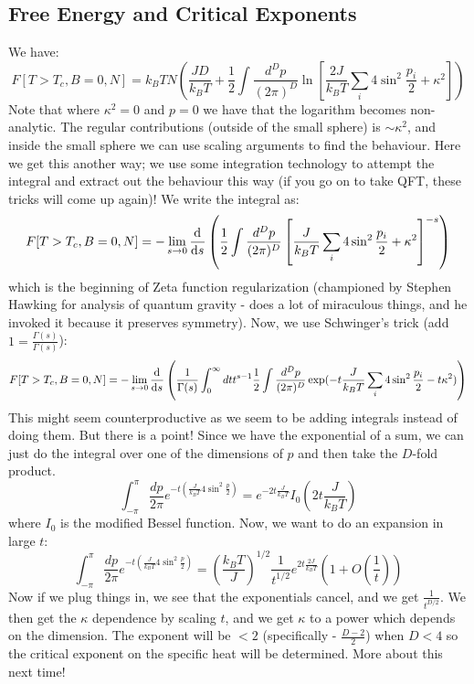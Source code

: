 \subsection{Free Energy and Critical Exponents}
We have:
\begin{equation}
    F[T > T_c, B = 0, N] = k_B TN\left(\frac{JD}{k_B T} + \frac{1}{2}\int \frac{d^Dp}{(2\pi)^D}\ln\left[\frac{2J}{k_B T} \sum_i 4\sin^2 \frac{p_i}{2} + \kappa^2\right] \right)
\end{equation}
Note that where $\kappa^2 = 0$ and $p = 0$ we have that the logarithm becomes non-analytic. The regular contributions (outside of the small sphere) is $\sim \kappa^2$, and inside the small sphere we can use scaling arguments to find the behaviour. Here we get this another way; we use some integration technology to attempt the integral and extract out the behaviour this way (if you go on to take QFT, these tricks will come up again)! We write the integral as:
\begin{equation}
    F[T > T_c, B = 0, N] = -\lim_{s \to 0}\dod{}{s}\left(\frac{1}{2}\int \frac{d^D p}{(2\pi)^D} \left[\frac{J}{k_B T}\sum_i 4\sin^2 \frac{p_i}{2} + \kappa^2\right]^{-s}\right)
\end{equation}
which is the beginning of Zeta function regularization (championed by Stephen Hawking for analysis of quantum gravity - does a lot of miraculous things, and he invoked it because it preserves symmetry). Now, we use Schwinger's trick (add $1 = \frac{\Gamma(s)}{\Gamma(s)}$):
\begin{equation}
    F[T > T_c, B = 0, N] = -\lim_{s \to 0}\dod{}{s}\left(\frac{1}{\Gamma(s)}\int_0^\infty dt t^{s-1}\frac{1}{2}\int \frac{d^Dp}{(2\pi)^D} \exp(-t\frac{J}{k_B T}\sum_i 4\sin^2\frac{p_i}{2} - t\kappa^2)\right)
\end{equation}
This might seem counterproductive as we seem to be adding integrals instead of doing them. But there is a point! Since we have the exponential of a sum, we can just do the integral over one of the dimensions of $p$ and then take the $D$-fold product.
\begin{equation}
    \int_{-\pi}^\pi \frac{dp}{2\pi} e^{-t\left(\frac{J}{k_B T}4\sin^2 \frac{p}{2}\right)} = e^{-2t\frac{J}{k_B T}}I_0(2t\frac{J}{k_B T})
\end{equation}
where $I_0$ is the modified Bessel function. Now, we want to do an expansion in large $t$:
\begin{equation}
    \int_{-\pi}^\pi \frac{dp}{2\pi} e^{-t\left(\frac{J}{k_B T}4\sin^2 \frac{p}{2}\right)} = \left(\frac{k_B T}{J}\right)^{1/2}\frac{1}{t^{1/2}}e^{2t\frac{2J}{k_B T}}\left(1 + O(\frac{1}{t})\right)
\end{equation}
Now if we plug things in, we see that the exponentials cancel, and we get $\frac{1}{t^{D/2}}$. We then get the $\kappa$ dependence by scaling $t$, and we get $\kappa$ to a power which depends on the dimension. The exponent will be $< 2$ (specifically - $\frac{D-2}{2}$) when $D < 4$ so the critical exponent on the specific heat will be determined. More about this next time!
